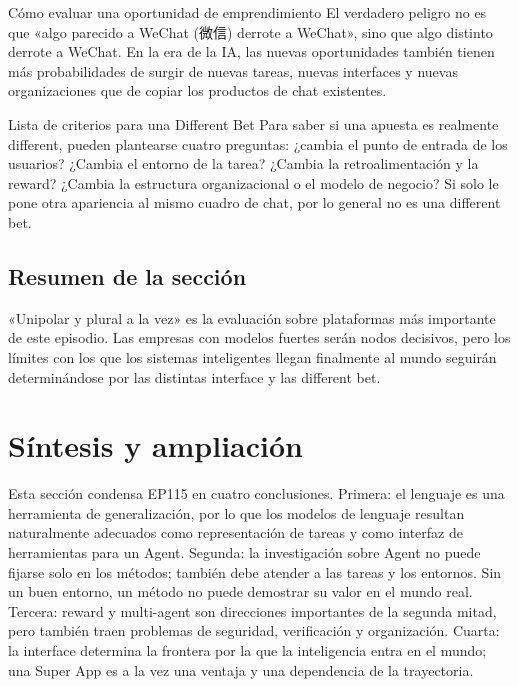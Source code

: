 \documentclass[a4paper]{article}
\begin{document}
\begin{importantbox}{Cómo evaluar una oportunidad de emprendimiento}
El verdadero peligro no es que «algo parecido a WeChat (微信) derrote a WeChat», sino que algo distinto derrote a WeChat. En la era de la IA, las nuevas oportunidades también tienen más probabilidades de surgir de nuevas tareas, nuevas interfaces y nuevas organizaciones que de copiar los productos de chat existentes.
\end{importantbox}

\begin{knowledgebox}{Lista de criterios para una Different Bet}
Para saber si una apuesta es realmente different, pueden plantearse cuatro preguntas: ¿cambia el punto de entrada de los usuarios? ¿Cambia el entorno de la tarea? ¿Cambia la retroalimentación y la reward? ¿Cambia la estructura organizacional o el modelo de negocio? Si solo le pone otra apariencia al mismo cuadro de chat, por lo general no es una different bet.
\end{knowledgebox}

\subsection{Resumen de la sección}

«Unipolar y plural a la vez» es la evaluación sobre plataformas más importante de este episodio. Las empresas con modelos fuertes serán nodos decisivos, pero los límites con los que los sistemas inteligentes llegan finalmente al mundo seguirán determinándose por las distintas interface y las different bet.
\section{Síntesis y ampliación}

Esta sección condensa EP115 en cuatro conclusiones. Primera: el lenguaje es una herramienta de generalización, por lo que los modelos de lenguaje resultan naturalmente adecuados como representación de tareas y como interfaz de herramientas para un Agent. Segunda: la investigación sobre Agent no puede fijarse solo en los métodos; también debe atender a las tareas y los entornos. Sin un buen entorno, un método no puede demostrar su valor en el mundo real. Tercera: reward y multi-agent son direcciones importantes de la segunda mitad, pero también traen problemas de seguridad, verificación y organización. Cuarta: la interface determina la frontera por la que la inteligencia entra en el mundo; una Super App es a la vez una ventaja y una dependencia de la trayectoria.
\end{document}
